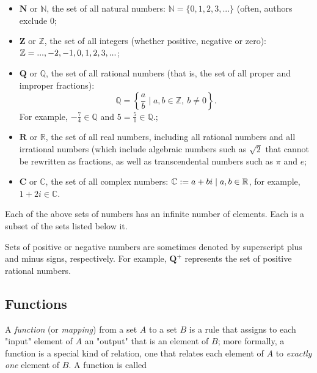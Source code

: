\begin{itemize}
    \item $\mathbf{N}$ or $\mathbb {N}$, the set of all natural numbers: $\mathbb{N}=\{0,1,2,3,...\}$ (often, authors exclude $0$;
    \item $\mathbf{Z}$ or $\mathbb {Z}$, the set of all integers (whether positive, negative or zero): $\mathbb{Z}=\\{...,-2,-1,0,1,2,3,...\\}$;
    \item $\mathbf{Q}$ or $\mathbb{Q}$, the set of all rational numbers (that is, the set of all proper and improper fractions): \[\mathbb{Q} = \left\{ \frac{a}{b} \mid a,b \in \mathbb{Z},\ b \ne 0 \right\}.\]  For example, $-\tfrac{7}{4} \in \mathbb{Q}$ and $5 = \tfrac{5}{1} \in \mathbb{Q}$.;
    \item $\mathbf{R}$ or $\mathbb {R}$, the set of all real numbers, including all rational numbers and all irrational numbers (which include algebraic numbers such as $\sqrt2$ that cannot be rewritten as fractions, as well as transcendental numbers such as $\pi$ and $e$;
    \item $\mathbf{C}$ or $\mathbb{C}$, the set of all complex numbers: $\mathbb{C} := \\{ a + bi \mid a,b \in \mathbb{R}\\}$, for example, $1 + 2i \in \mathbb{C}$.
\end{itemize}

Each of the above sets of numbers has an infinite number of elements. Each is a subset of
the sets listed below it.



Sets of positive or negative numbers are sometimes denoted by superscript plus and minus
signs, respectively. For example, $\mathbf{Q}^+$ represents the set of positive rational
numbers.




\subsection{Functions}
\label{sss:func-0eaa}




A \textit{function} (or \textit{mapping}) from a set $A$ to a set $B$ is a rule that
assigns to each "input" element of $A$ an "output" that is an element of $B$; more
formally, a function is a special kind of relation, one that relates each element of $A$
to \textit{exactly one} element of $B$. A function is called



